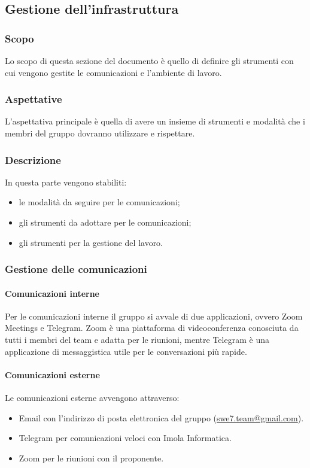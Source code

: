 \subsection{Gestione dell'infrastruttura}
\subsubsection{Scopo}
Lo scopo di questa sezione del documento è quello di definire gli strumenti con cui vengono gestite le comunicazioni e
l'ambiente di lavoro.

\subsubsection{Aspettative}
L'aspettativa principale è quella di avere un insieme di strumenti e modalità che i membri del gruppo dovranno utilizzare e rispettare.

\subsubsection{Descrizione}
In questa parte vengono stabiliti:
\begin{itemize}
    \item le modalità da seguire per le comunicazioni;
    \item gli strumenti da adottare per le comunicazioni;
    \item gli strumenti per la gestione del lavoro.
\end{itemize}

\subsubsection{Gestione delle comunicazioni} \hfill \break
\paragraph{Comunicazioni interne}
Per le comunicazioni interne il gruppo si avvale di due applicazioni, ovvero Zoom Meetings e Telegram.
Zoom è una piattaforma di videoconferenza conosciuta da tutti i membri del team e adatta per le riunioni, mentre Telegram
è una applicazione di messaggistica utile per le conversazioni più rapide.

\paragraph{Comunicazioni esterne} \hfill \break
Le comunicazioni esterne avvengono attraverso:
\begin{itemize}
    \item Email con l'indirizzo di posta elettronica del gruppo (\href{mailto:swe7.team@gmail.com}{swe7.team@gmail.com}).
    \item Telegram per comunicazioni veloci con Imola Informatica.
    \item Zoom per le riunioni con il proponente.
\end{itemize}

